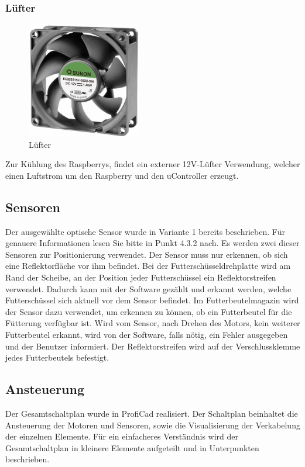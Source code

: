 \subsubsection{Lüfter}
\begin{figure}[H] 
\begin{center}

\includegraphics[width=5cm]{Bilder/Bauteile/Luefter}
\caption{Lüfter}
\label{Luefter}

\end{center}
\end{figure}
Zur Kühlung des Raspberrys, findet ein externer 12V-Lüfter Verwendung, welcher einen Luftstrom um den Raspberry und den \ac{uC}ontroller erzeugt.
\subsection{Sensoren}
Der ausgewählte optische Sensor wurde in Variante 1 bereits beschrieben. Für genauere Informationen lesen Sie bitte in Punkt 4.3.2 nach.
Es werden zwei dieser Sensoren zur Positionierung verwendet. Der Sensor muss nur erkennen, ob sich eine Reflektorfläche vor ihm befindet. Bei der Futterschüsseldrehplatte wird am Rand der Scheibe, an der Position jeder Futterschüssel ein Reflektorstreifen verwendet. Dadurch kann mit der Software gezählt und erkannt werden, welche Futterschüssel sich aktuell vor dem Sensor befindet. Im Futterbeutelmagazin wird der Sensor dazu verwendet, um erkennen zu können, ob ein Futterbeutel für die Fütterung verfügbar ist. Wird vom Sensor, nach Drehen des Motors, kein weiterer Futterbeutel erkannt, wird von der Software, falls nötig, ein Fehler ausgegeben und der Benutzer informiert. Der Reflektorstreifen wird auf der Verschlussklemme jedes Futterbeutels befestigt.
\subsection{Ansteuerung}
Der Gesamtschaltplan wurde in ProfiCad realisiert. Der Schaltplan beinhaltet die Ansteuerung der Motoren und Sensoren, sowie die Visualisierung der Verkabelung der einzelnen Elemente.
Für ein einfacheres Verständnis wird der Gesamtschaltplan in kleinere Elemente aufgeteilt und in Unterpunkten beschrieben.
\newpage
